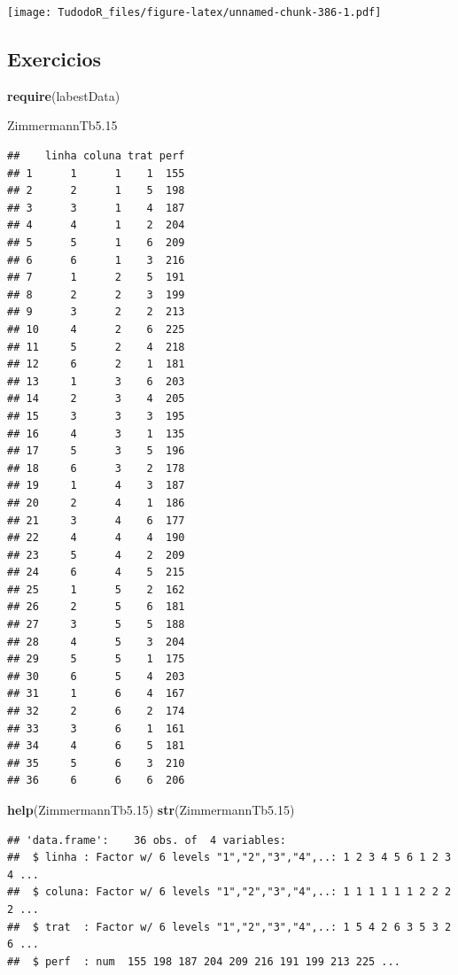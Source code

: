 \documentclass[
]{book}
\newenvironment{Shaded}{\begin{snugshade}}{\end{snugshade}}
\newcommand{\FloatTok}[1]{\textcolor[rgb]{0.00,0.00,0.81}{#1}}
\newcommand{\KeywordTok}[1]{\textcolor[rgb]{0.13,0.29,0.53}{\textbf{#1}}}
\newcommand{\NormalTok}[1]{#1}
\begin{document}
\texttt{[image: TudodoR\_files/figure-latex/unnamed-chunk-386-1.pdf]}

\hypertarget{exercicios}{%
\subsection{Exercicios}\label{exercicios}}

\begin{Shaded}
\begin{Highlighting}[]
\KeywordTok{require}\NormalTok{(labestData)}

\NormalTok{ZimmermannTb5}\FloatTok{.15}
\end{Highlighting}
\end{Shaded}

\begin{verbatim}
##    linha coluna trat perf
## 1      1      1    1  155
## 2      2      1    5  198
## 3      3      1    4  187
## 4      4      1    2  204
## 5      5      1    6  209
## 6      6      1    3  216
## 7      1      2    5  191
## 8      2      2    3  199
## 9      3      2    2  213
## 10     4      2    6  225
## 11     5      2    4  218
## 12     6      2    1  181
## 13     1      3    6  203
## 14     2      3    4  205
## 15     3      3    3  195
## 16     4      3    1  135
## 17     5      3    5  196
## 18     6      3    2  178
## 19     1      4    3  187
## 20     2      4    1  186
## 21     3      4    6  177
## 22     4      4    4  190
## 23     5      4    2  209
## 24     6      4    5  215
## 25     1      5    2  162
## 26     2      5    6  181
## 27     3      5    5  188
## 28     4      5    3  204
## 29     5      5    1  175
## 30     6      5    4  203
## 31     1      6    4  167
## 32     2      6    2  174
## 33     3      6    1  161
## 34     4      6    5  181
## 35     5      6    3  210
## 36     6      6    6  206
\end{verbatim}

\begin{Shaded}
\begin{Highlighting}[]
\KeywordTok{help}\NormalTok{(ZimmermannTb5}\FloatTok{.15}\NormalTok{) }
\KeywordTok{str}\NormalTok{(ZimmermannTb5}\FloatTok{.15}\NormalTok{)}
\end{Highlighting}
\end{Shaded}

\begin{verbatim}
## 'data.frame':    36 obs. of  4 variables:
##  $ linha : Factor w/ 6 levels "1","2","3","4",..: 1 2 3 4 5 6 1 2 3 4 ...
##  $ coluna: Factor w/ 6 levels "1","2","3","4",..: 1 1 1 1 1 1 2 2 2 2 ...
##  $ trat  : Factor w/ 6 levels "1","2","3","4",..: 1 5 4 2 6 3 5 3 2 6 ...
##  $ perf  : num  155 198 187 204 209 216 191 199 213 225 ...
\end{verbatim}
\end{document}
